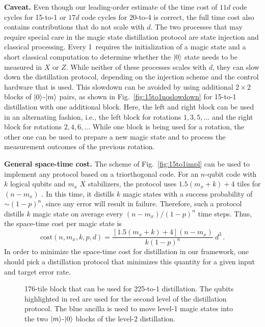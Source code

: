 \documentclass[prx,aps,letterpaper,twocolumn,allowfontchageintitle=true,accepted=2019-02-01]{quantumarticle}
\begin{document}
\textbf{Caveat.} Even though our leading-order estimate of the time cost of $11d$ code cycles for 15-to-1 or $17d$ code cycles for 20-to-4 is correct, the full time cost also contains contributions that do not scale with $d$. The two processes that may require special care in the magic state distillation protocol are state injection and classical processing. Every 1\clock \ requires the initialization of a magic state and a short classical computation to determine whether the $\ket{0}$ state needs to be measured in $X$ or $Z$. While neither of these processes scales with $d$, they can slow down the distillation protocol, depending on the injection scheme and the control hardware that is used. This slowdown can be avoided by using additional $2\times 2$ blocks of $\ket{0}$-$\ket{m}$ pairs, as shown in Fig.~\ref{fig:15to1noslowdown} for 15-to-1 distillation with one additional block. Here, the left and right block can be used in an alternating fashion, i.e., the left block for rotations $1,3,5,\dots$ and the right block for rotations $2,4,6,\dots$ While one block is being used for a rotation, the other one can be used to prepare a new magic state and to process the measurement outcomes of the previous rotation.

\pagebreak

\textbf{General space-time cost.} The scheme of Fig.~\ref{fig:15to1impl} can be used to implement any protocol based on a triorthogonal code. For an $n$-qubit code with $k$ logical qubits and $m_x$ $X$ stabilizers, the protocol uses $1.5(m_x+k)+4$ tiles for $(n-m_x)$ \clock. In this time, it distills $k$ magic states with a success probability of ${\sim}(1-p)^n$, since any error will result in failure. Therefore, such a protocol distills $k$ magic state on average every $(n-m_x)/(1-p)^n$ time steps. Thus, the space-time cost per magic state is
\begin{equation}
	\mathrm{cost}(n,m_x,k,p,d) = \frac{[1.5(m_x+k)+4](n-m_x)}{k(1-p)^n}~d^3 \, .
	\label{eqn:distcost}
\end{equation}
In order to minimize the space-time cost for distillation in our framework, one should pick a distillation protocol that minimizes this quantity for a given input and target error rate.



\begin{figure}[t!]
\centering
\def\svgwidth{0.9\linewidth}

\caption{176-tile block that can be used for 225-to-1 distillation. The qubits highlighted in red are used for the second level of the distillation protocol. The blue ancilla is used to move level-1 magic states into the two $\ket{m}$-$\ket{0}$ blocks of the level-2 distillation.}
\label{fig:225to1}
\end{figure}
\end{document}
